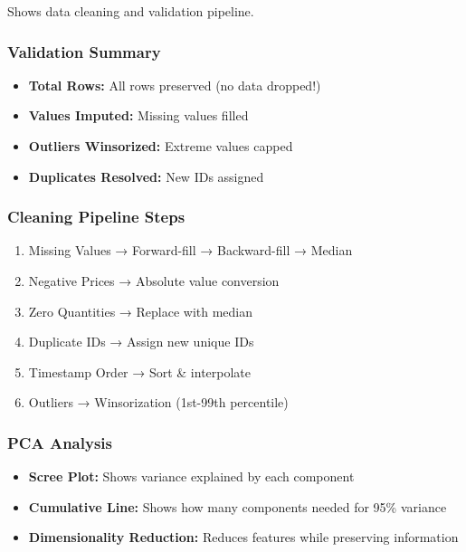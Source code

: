 \documentclass[12pt,a4paper]{article}
\begin{document}
Shows data cleaning and validation pipeline.

\subsubsection{Validation Summary}
\begin{itemize}
    \item \textbf{Total Rows:} All rows preserved (no data dropped!)
    \item \textbf{Values Imputed:} Missing values filled
    \item \textbf{Outliers Winsorized:} Extreme values capped
    \item \textbf{Duplicates Resolved:} New IDs assigned
\end{itemize}

\subsubsection{Cleaning Pipeline Steps}
\begin{enumerate}
    \item Missing Values → Forward-fill → Backward-fill → Median
    \item Negative Prices → Absolute value conversion
    \item Zero Quantities → Replace with median
    \item Duplicate IDs → Assign new unique IDs
    \item Timestamp Order → Sort \& interpolate
    \item Outliers → Winsorization (1st-99th percentile)
\end{enumerate}

\subsubsection{PCA Analysis}
\begin{itemize}
    \item \textbf{Scree Plot:} Shows variance explained by each component
    \item \textbf{Cumulative Line:} Shows how many components needed for 95\% variance
    \item \textbf{Dimensionality Reduction:} Reduces features while preserving information
\end{itemize}

\end{document}
